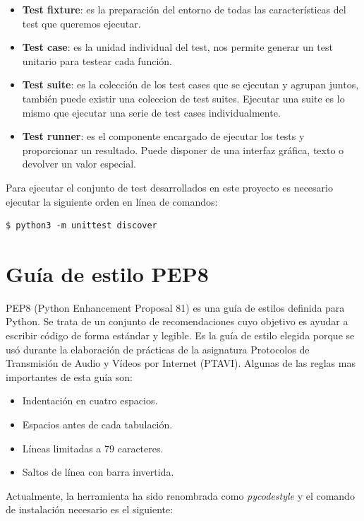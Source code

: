 \documentclass[a4paper, 12pt]{book}
\begin{document}
\begin{itemize}
	\item \textbf{Test fixture}: es la preparación del entorno de todas las características del test que queremos ejecutar.
	\item \textbf{Test case}: es la unidad individual del test, nos permite generar un test unitario para testear cada función.
	\item \textbf{Test suite}: es la colección de los test cases que se ejecutan y agrupan juntos, también puede existir una coleccion de test suites. Ejecutar una suite es lo mismo que ejecutar una serie de test cases individualmente.
	\item \textbf{Test runner}: es el componente encargado de ejecutar los tests y proporcionar un resultado. Puede disponer de una interfaz gráfica, texto o devolver un valor especial.
\end{itemize}
 
Para ejecutar el conjunto de test desarrollados en este proyecto es necesario ejecutar la siguiente orden en línea de comandos:

\begin{lstlisting}[style=consola,numbers=none]
$ python3 -m unittest discover
\end{lstlisting}

\section{Guía de estilo PEP8} 
\label{sec:pep8}

PEP8 (Python Enhancement Proposal 81) es una guía de estilos definida para Python. Se trata de un conjunto de recomendaciones cuyo objetivo es ayudar a escribir código de forma estándar y legible. Es la guía de estilo elegida porque se usó durante la elaboración de prácticas de la asignatura Protocolos de Transmisión de Audio y Vídeos por Internet (PTAVI). Algunas de las reglas mas importantes de esta guía son:

\begin{itemize}
	\item Indentación en cuatro espacios.
	\item Espacios antes de cada tabulación.
	\item Líneas limitadas a 79 caracteres.
	\item Saltos de línea con barra invertida.
\end{itemize}

Actualmente, la herramienta ha sido renombrada como \textit{pycodestyle} y el comando de instalación necesario es el siguiente:
\end{document}
